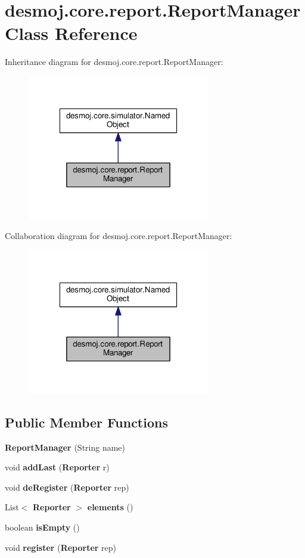 \section{desmoj.\-core.\-report.\-Report\-Manager Class Reference}
\label{classdesmoj_1_1core_1_1report_1_1_report_manager}


Inheritance diagram for desmoj.\-core.\-report.\-Report\-Manager\-:
\nopagebreak
\begin{figure}[H]
\begin{center}
\leavevmode
\includegraphics[width=226pt]{classdesmoj_1_1core_1_1report_1_1_report_manager__inherit__graph}
\end{center}
\end{figure}


Collaboration diagram for desmoj.\-core.\-report.\-Report\-Manager\-:
\nopagebreak
\begin{figure}[H]
\begin{center}
\leavevmode
\includegraphics[width=226pt]{classdesmoj_1_1core_1_1report_1_1_report_manager__coll__graph}
\end{center}
\end{figure}
\subsection*{Public Member Functions}
\begin{DoxyCompactItemize}
\item 
{\bf Report\-Manager} (String name)
\item 
void {\bf add\-Last} ({\bf Reporter} r)
\item 
void {\bf de\-Register} ({\bf Reporter} rep)
\item 
List$<$ {\bf Reporter} $>$ {\bf elements} ()
\item 
boolean {\bf is\-Empty} ()
\item 
void {\bf register} ({\bf Reporter} rep)
\end{DoxyCompactItemize}
